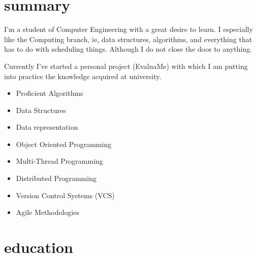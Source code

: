 \documentclass[]{friggeri-cv} %
\begin{document}

\section{summary}



I'm a student of Computer Engineering with a great desire to learn. I especially like the Computing branch, ie, data structures, algorithms, and everything that has to do with scheduling things. Although I do not close the door to anything. 

Currently I've started a personal project (EvaluaMe) with which I am putting into practice the knowledge acquired at university.

\noindent\begin{minipage}[t]{0.5\linewidth}
    \begin{itemize}
    	\item{Proficient Algorithms}
	\item{Data Structures}
    	\item{Data representation}
    	\item{Object Oriented Programming}

    \end{itemize}
    \end{minipage}%
    \begin{minipage}[t]{0.5\linewidth}
    \begin{itemize}
    	\item{Multi-Thread Programming}
    	\item{Distributed Programming}
   	\item{Version Control Systems (VCS)}
   	\item{Agile Methodologies}
    \end{itemize}
\end{minipage}\par\bigskip



\section{education}
\end{document}
